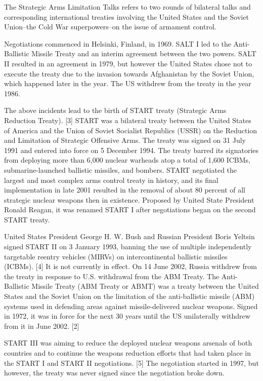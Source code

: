 \documentclass[twocolumn,a4paper]{article}
\begin{document}
The Strategic Arms Limitation Talks refers to two rounds of bilateral 
talks and corresponding international treaties involving the United 
States and the Soviet Union--the Cold War superpowers--on the issue of 
armament control. 

Negotiations commenced in Helsinki, Finland, in 1969. SALT I led to 
the Anti-Ballistic Missile Treaty and an interim agreement between 
the two powers. SALT II resulted in an agreement in 1979, but however 
the United States chose not to execute the treaty due to the invasion 
towards Afghanistan by the Soviet Union, which happened later in the 
year. The US withdrew from the treaty in the year 1986.

The above incidents lead to the birth of START treaty (Strategic Arms 
Reduction Treaty). [3] START was a bilateral treaty between the United
States of America and the Union of Soviet Socialist Republics (USSR) 
on the Reduction and Limitation of Strategic Offensive Arms. The treaty
was signed on 31 July 1991 and entered into force on 5 December 1994. 
The treaty barred its signatories from deploying more than 6,000 nuclear
warheads atop a total of 1,600 ICBMs, submarine-launched ballistic 
missiles, and bombers. START negotiated the largest and most complex 
arms control treaty in history, and its final implementation in late 
2001 resulted in the removal of about 80 percent of all strategic nuclear
weapons then in existence. Proposed by United State President Ronald 
Reagan, it was renamed START I after negotiations began on the second 
START treaty.

United States President George H. W. Bush and Russian President Boris 
Yeltsin signed START II on 3 January 1993, banning the use of multiple 
independently targetable reentry vehicles (MIRVs) on intercontinental 
ballistic missiles (ICBMs). [4] It is not currently in effect. On 14 
June 2002, Russia withdrew from the treaty in response to U.S. withdrawal 
from the ABM Treaty. The Anti-Ballistic Missile Treaty (ABM Treaty or ABMT)
was a treaty between the United States and the Soviet Union on the 
limitation of the anti-ballistic missile (ABM) systems used in defending
areas against missile-delivered nuclear weapons. Signed in 1972, it was 
in force for the next 30 years until the US unilaterally withdrew from 
it in June 2002. [2]

START III was aiming to reduce the deployed nuclear weapons arsenals 
of both countries and to continue the weapons reduction efforts that 
had taken place in the START I and START II negotiations. [5] The 
negotiation started in 1997, but however, the treaty was never signed
since the negotiation broke down.
\end{document}
